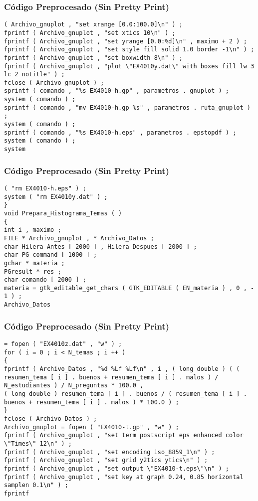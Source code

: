 \documentclass{beamer}
\begin{document}
\begin{frame}[fragile]
\frametitle{C\'odigo Preprocesado (Sin Pretty Print)}
\begin{lstlisting}[style=CStyle]
( Archivo_gnuplot , "set xrange [0.0:100.0]\n" ) ; 
fprintf ( Archivo_gnuplot , "set xtics 10\n" ) ; 
fprintf ( Archivo_gnuplot , "set yrange [0.0:%d]\n" , maximo + 2 ) ; 
fprintf ( Archivo_gnuplot , "set style fill solid 1.0 border -1\n" ) ; 
fprintf ( Archivo_gnuplot , "set boxwidth 8\n" ) ; 
fprintf ( Archivo_gnuplot , "plot \"EX4010y.dat\" with boxes fill lw 3 lc 2 notitle" ) ; 
fclose ( Archivo_gnuplot ) ; 
sprintf ( comando , "%s EX4010-h.gp" , parametros . gnuplot ) ; 
system ( comando ) ; 
sprintf ( comando , "mv EX4010-h.gp %s" , parametros . ruta_gnuplot ) ; 
system ( comando ) ; 
sprintf ( comando , "%s EX4010-h.eps" , parametros . epstopdf ) ; 
system ( comando ) ; 
system \end{lstlisting}
\end{frame}
\begin{frame}[fragile]
\frametitle{C\'odigo Preprocesado (Sin Pretty Print)}
\begin{lstlisting}[style=CStyle]
( "rm EX4010-h.eps" ) ; 
system ( "rm EX4010y.dat" ) ; 
} 
void Prepara_Histograma_Temas ( ) 
{ 
int i , maximo ; 
FILE * Archivo_gnuplot , * Archivo_Datos ; 
char Hilera_Antes [ 2000 ] , Hilera_Despues [ 2000 ] ; 
char PG_command [ 1000 ] ; 
gchar * materia ; 
PGresult * res ; 
char comando [ 2000 ] ; 
materia = gtk_editable_get_chars ( GTK_EDITABLE ( EN_materia ) , 0 , - 1 ) ; 
Archivo_Datos \end{lstlisting}
\end{frame}
\begin{frame}[fragile]
\frametitle{C\'odigo Preprocesado (Sin Pretty Print)}
\begin{lstlisting}[style=CStyle]
= fopen ( "EX4010z.dat" , "w" ) ; 
for ( i = 0 ; i < N_temas ; i ++ ) 
{ 
fprintf ( Archivo_Datos , "%d %Lf %Lf\n" , i , ( long double ) ( ( resumen_tema [ i ] . buenos + resumen_tema [ i ] . malos ) / N_estudiantes ) / N_preguntas * 100.0 , 
( long double ) resumen_tema [ i ] . buenos / ( resumen_tema [ i ] . buenos + resumen_tema [ i ] . malos ) * 100.0 ) ; 
} 
fclose ( Archivo_Datos ) ; 
Archivo_gnuplot = fopen ( "EX4010-t.gp" , "w" ) ; 
fprintf ( Archivo_gnuplot , "set term postscript eps enhanced color \"Times\" 12\n" ) ; 
fprintf ( Archivo_gnuplot , "set encoding iso_8859_1\n" ) ; 
fprintf ( Archivo_gnuplot , "set grid y2tics ytics\n" ) ; 
fprintf ( Archivo_gnuplot , "set output \"EX4010-t.eps\"\n" ) ; 
fprintf ( Archivo_gnuplot , "set key at graph 0.24, 0.85 horizontal samplen 0.1\n" ) ; 
fprintf \end{lstlisting}
\end{frame}
\end{document}
